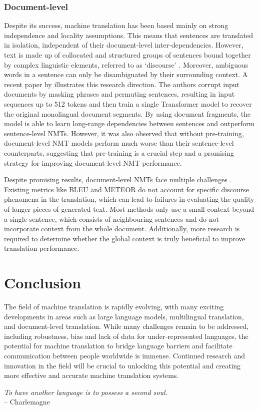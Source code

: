 \documentclass[11pt]{article}
\begin{document}
\subsubsection*{Document-level} \vspace{-2mm}
Despite its success, machine translation has been based mainly on strong independence and locality assumptions. This means that sentences are translated in isolation, independent of their document-level inter-dependencies.
However, text is made up of collocated and structured groups of sentences bound together by complex linguistic elements, referred to as `discourse' \citep{slp2e}. 
Moreover, ambiguous words in a sentence can only be disambiguated by their surrounding context.
A recent paper by \cite{liu-etal-2020-multilingual-denoising} illustrates this research direction. The authors corrupt input documents by masking phrases and permuting sentences, resulting in input sequences up to 512 tokens and then train a single Transformer model to recover the original monolingual document segments. By using document fragments, the model is able to learn long-range dependencies between sentences and outperform sentence-level NMTs. However, it was also observed that without pre-training, document-level NMT models perform much worse than their sentence-level counterparts, suggesting that pre-training is a crucial step and a promising strategy for improving document-level NMT performance.

Despite promising results, document-level NMTs face multiple challenges \citep{maruf2021survey}.
Existing metrics like BLEU and METEOR do not account for specific discourse phenomena in the translation, which can lead to failures in evaluating the quality of longer pieces of generated text.
Most methods only use a small context beyond a single sentence, which consists of neighbouring sentences and do not incorporate context from the whole document. 
Additionally, more research is required to determine whether the global context is truly beneficial to improve translation performance.

\section{Conclusion} \vspace{-0.8em}
The field of machine translation is rapidly evolving, with many exciting developments in areas such as large language models, multilingual translation, and document-level translation. While many challenges remain to be addressed, including robustness, bias and lack of data for under-represented languages, the potential for machine translation to bridge language barriers and facilitate communication between people worldwide is immense. Continued research and innovation in the field will be crucial to unlocking this potential and creating more effective and accurate machine translation systems.

\vspace*{\fill}
\hspace*{\fill} \textit{To have another language is to possess a second soul.} \\
\hspace*{\fill} -- Charlemagne

\newpage

\end{document}
